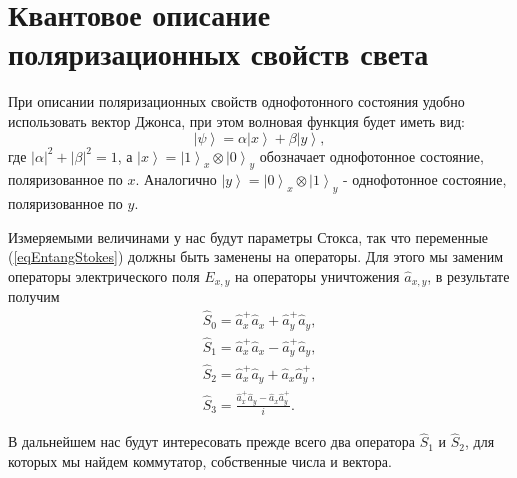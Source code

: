 \section{Квантовое описание поляризационных свойств света}
При описании поляризационных свойств однофотонного состояния удобно
использовать вектор Джонса, при этом волновая функция будет иметь вид:
\begin{equation}
\left|\psi\right> = 
\alpha \left|x\right> + 
\beta \left|y\right>,
\label{eqEntangSimpleState}
\end{equation}
где $\left|\alpha\right|^2 + \left|\beta\right|^2 = 1$, а
$\left|x\right> = \left|1\right>_x\otimes\left|0\right>_y$ обозначает
однофотонное состояние, поляризованное по $x$. Аналогично 
$\left|y\right> = \left|0\right>_x\otimes\left|1\right>_y$ -
однофотонное состояние, поляризованное по $y$. 

Измеряемыми величинами у нас будут параметры Стокса, так что переменные
(\ref{eqEntangStokes}) должны быть заменены на операторы. Для этого мы
заменим операторы электрического поля $E_{x,y}$ на операторы
уничтожения $\hat{a}_{x,y}$, в результате получим
\begin{eqnarray}
\hat{S}_0 = \hat{a}_x^{+} \hat{a}_x + \hat{a}_y^{+} \hat{a}_y,
\nonumber \\
\hat{S}_1 = \hat{a}_x^{+} \hat{a}_x - \hat{a}_y^{+} \hat{a}_y,
\nonumber \\
\hat{S}_2 = \hat{a}_x^{+} \hat{a}_y + \hat{a}_x \hat{a}_y^{+},
\nonumber \\
\hat{S}_3 = \frac{\hat{a}_x^{+} \hat{a}_y - \hat{a}_x \hat{a}_y^{+}}{i}.
\label{eqEntangStokesOper}
\end{eqnarray}

В дальнейшем нас будут интересовать прежде всего два оператора
$\hat{S}_1$ и $\hat{S}_2$, для которых мы найдем коммутатор,
собственные числа и вектора.

